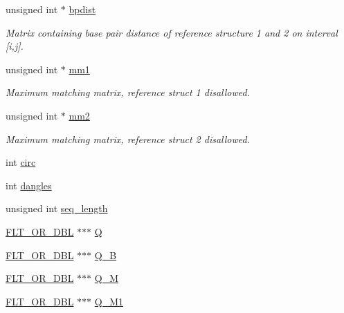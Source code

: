 \begin{DoxyCompactItemize}
unsigned int $\ast$ \mbox{\hyperlink{struct_two_dpfold__vars_accef8eaa05fa57ca33aa22cbc7b7aaff}{bpdist}}
\begin{DoxyCompactList}\small\item\em Matrix containing base pair distance of reference structure 1 and 2 on interval \mbox{[}i,j\mbox{]}. \end{DoxyCompactList}\item 
unsigned int $\ast$ \mbox{\hyperlink{struct_two_dpfold__vars_a7c9e9af6224d4696118e05835441863d}{mm1}}
\begin{DoxyCompactList}\small\item\em Maximum matching matrix, reference struct 1 disallowed. \end{DoxyCompactList}\item 
unsigned int $\ast$ \mbox{\hyperlink{struct_two_dpfold__vars_affb913470783f9edb12a0bfc22466269}{mm2}}
\begin{DoxyCompactList}\small\item\em Maximum matching matrix, reference struct 2 disallowed. \end{DoxyCompactList}\item 
int \mbox{\hyperlink{struct_two_dpfold__vars_ad1b0ec8721d3ff1522a41c0bcedc3fd5}{circ}}
\item 
int \mbox{\hyperlink{struct_two_dpfold__vars_afdd636375f84532f290008c9389ae6bf}{dangles}}
\item 
unsigned int \mbox{\hyperlink{struct_two_dpfold__vars_aa5bbaa75d5c380b171a247431dd0a607}{seq\+\_\+length}}
\item 
\mbox{\hyperlink{group__data__structures_ga31125aeace516926bf7f251f759b6126}{F\+L\+T\+\_\+\+O\+R\+\_\+\+D\+BL}} $\ast$$\ast$$\ast$ \mbox{\hyperlink{struct_two_dpfold__vars_a4932f988731a07f69276223a68f715e9}{Q}}
\item 
\mbox{\hyperlink{group__data__structures_ga31125aeace516926bf7f251f759b6126}{F\+L\+T\+\_\+\+O\+R\+\_\+\+D\+BL}} $\ast$$\ast$$\ast$ \mbox{\hyperlink{struct_two_dpfold__vars_ad17010c9f2b058aa59459c46411e1725}{Q\+\_\+B}}
\item 
\mbox{\hyperlink{group__data__structures_ga31125aeace516926bf7f251f759b6126}{F\+L\+T\+\_\+\+O\+R\+\_\+\+D\+BL}} $\ast$$\ast$$\ast$ \mbox{\hyperlink{struct_two_dpfold__vars_aa40c26fa4c1dd244be7307246c4680aa}{Q\+\_\+M}}
\item 
\mbox{\hyperlink{group__data__structures_ga31125aeace516926bf7f251f759b6126}{F\+L\+T\+\_\+\+O\+R\+\_\+\+D\+BL}} $\ast$$\ast$$\ast$ \mbox{\hyperlink{struct_two_dpfold__vars_ab56904033d87011d0a2bbfd870cd879a}{Q\+\_\+\+M1}}

\end{DoxyCompactItemize}
